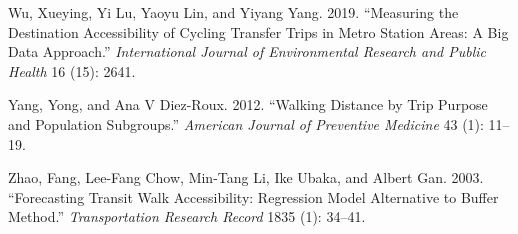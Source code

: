 \documentclass[preprint, 3p,
authoryear]{elsarticle} %
\newlength{\cslhangindent}
\newlength{\cslentryspacingunit} %
\newenvironment{CSLReferences}[2] %
 {%
  \setlength{\parindent}{0pt}
  \ifodd #1
  \let\oldpar\par
  \def\par{\hangindent=\cslhangindent\oldpar}
  \fi
  \setlength{\parskip}{#2\cslentryspacingunit}
 }%
 {}
\begin{document}
\begin{CSLReferences}{1}{0}
\leavevmode{}%
Wu, Xueying, Yi Lu, Yaoyu Lin, and Yiyang Yang. 2019. {``Measuring the
Destination Accessibility of Cycling Transfer Trips in Metro Station
Areas: A Big Data Approach.''} \emph{International Journal of
Environmental Research and Public Health} 16 (15): 2641.

\leavevmode{}%
Yang, Yong, and Ana V Diez-Roux. 2012. {``Walking Distance by Trip
Purpose and Population Subgroups.''} \emph{American Journal of
Preventive Medicine} 43 (1): 11--19.

\leavevmode{}%
Zhao, Fang, Lee-Fang Chow, Min-Tang Li, Ike Ubaka, and Albert Gan. 2003.
{``Forecasting Transit Walk Accessibility: Regression Model Alternative
to Buffer Method.''} \emph{Transportation Research Record} 1835 (1):
34--41.

\end{CSLReferences}
\end{document}
